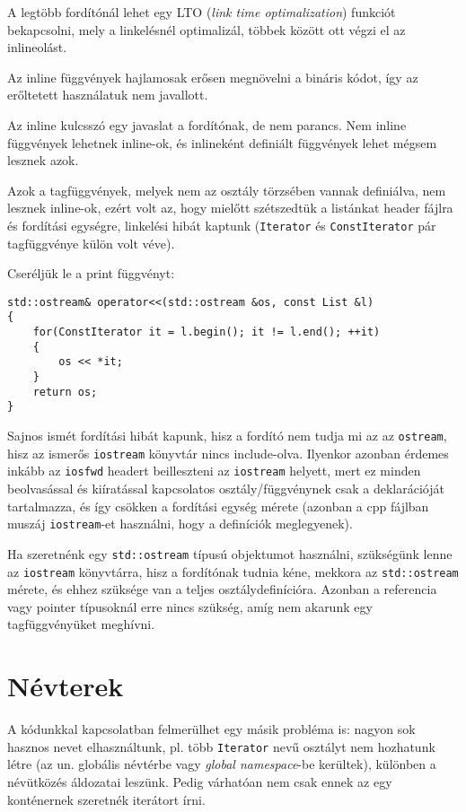 \documentclass[../cpp_book/cpp_book.tex]{subfiles}
\begin{document}
	\begin{note}
		A legtöbb fordítónál lehet egy LTO (\textit{link time optimalization}) funkciót bekapcsolni, mely a linkelésnél optimalizál, többek között ott végzi el az inlineolást.
	\end{note}
	\begin{note}
		Az inline függvények hajlamosak erősen megnövelni a bináris kódot, így az erőltetett használatuk nem javallott.
	\end{note}
	\begin{note}
		Az inline kulcsszó egy javaslat a fordítónak, de nem parancs. Nem inline függvények lehetnek inline-ok, és inlineként definiált függvények lehet mégsem lesznek azok.
	\end{note}
	Azok a tagfüggvények, melyek nem az osztály törzsében vannak definiálva, nem lesznek inline-ok, ezért volt az, hogy mielőtt szétszedtük a listánkat header fájlra és fordítási egységre, linkelési hibát kaptunk (\texttt{Iterator} és \texttt{ConstIterator} pár tagfüggvénye külön volt véve).
	\medskip
	
	Cseréljük le a print függvényt:
	\begin{lstlisting}
std::ostream& operator<<(std::ostream &os, const List &l)
{
	for(ConstIterator it = l.begin(); it != l.end(); ++it)
	{
		os << *it;
	}
	return os;
}
	\end{lstlisting}
	Sajnos ismét fordítási hibát kapunk, hisz a fordító nem tudja mi az az \texttt{ostream}, hisz az ismerős \texttt{iostream} könyvtár nincs include-olva. Ilyenkor azonban érdemes inkább az \texttt{iosfwd} headert beilleszteni az \texttt{iostream} helyett, mert ez minden beolvasással és kiíratással kapcsolatos osztály/függvénynek csak a deklarációját tartalmazza, és így csökken a fordítási egység mérete (azonban a cpp fájlban muszáj \texttt{iostream}-et használni, hogy a definíciók meglegyenek).
	\begin{note}
		Ha szeretnénk egy \texttt{std::ostream} típusú objektumot használni, szükségünk lenne az \texttt{iostream} könyvtárra, hisz a fordítónak tudnia kéne, mekkora az \texttt{std::ostream} mérete, és ehhez szüksége van a teljes osztálydefinícióra. Azonban a referencia vagy pointer típusoknál erre nincs szükség, amíg nem akarunk egy tagfüggvényüket meghívni.
	\end{note}
	\section{Névterek}
	A kódunkkal kapcsolatban felmerülhet egy másik probléma is: nagyon sok hasznos nevet elhasználtunk, pl. több \texttt{Iterator} nevű osztályt nem hozhatunk létre (az un. globális névtérbe vagy \textit{global namespace}-be kerültek), különben a névütközés áldozatai leszünk. Pedig várhatóan nem csak ennek az egy konténernek szeretnék iterátort írni.
	\smallskip
	
\end{document}
